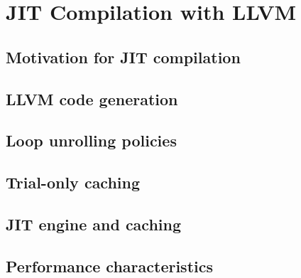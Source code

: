 \chapter{JIT Compilation with LLVM}
\label{ch:jit}

\section{Motivation for JIT compilation}
\label{sec:jit:motivation}


\section{LLVM code generation}
\label{sec:jit:llvm}


\section{Loop unrolling policies}
\label{sec:jit:unrolling}


\section{Trial-only caching}
\label{sec:jit:trialcache}


\section{JIT engine and caching}
\label{sec:jit:engine}


\section{Performance characteristics}
\label{sec:jit:performance}

